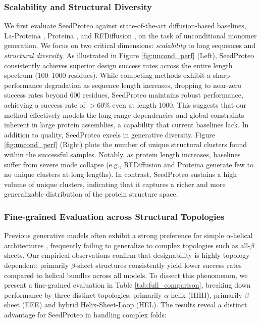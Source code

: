 \subsubsection{Scalability and Structural Diversity}
We first evaluate SeedProteo against state-of-the-art diffusion-based baselines, La-Proteina \cite{geffnerLaProteinaAtomisticProtein2025}, Proteina \cite{geffnerProteinaScalingFlowbased2024}, and RFDiffusion \cite{watsonNovoDesignProtein2023}, on the task of unconditional monomer generation. We focus on two critical dimensions: \textit{scalability} to long sequences and \textit{structural diversity}. As illustrated in Figure \ref{fig:uncond_perf} (Left), SeedProteo consistently achieves superior design success rates across the entire length spectrum (100--1000 residues). While competing methods exhibit a sharp performance degradation as sequence length increases, dropping to near-zero success rates beyond 600 residues, SeedProteo maintains robust performance, achieving a success rate of $>60\%$ even at length 1000. This suggests that our method effectively models the long-range dependencies and global constraints inherent in large protein assemblies, a capability that current baselines lack. In addition to quality, SeedProteo excels in generative diversity. Figure \ref{fig:uncond_perf} (Right) plots the number of unique structural clusters found within the successful samples. Notably, as protein length increases, baselines suffer from severe mode collapse (e.g., RFDiffusion and Proteina generate few to no unique clusters at long lengths). In contrast, SeedProteo sustains a high volume of unique clusters, indicating that it captures a richer and more generalizable distribution of the protein structure space.





\subsubsection{Fine-grained Evaluation across Structural Topologies}
Previous generative models often exhibit a strong preference for simple $\alpha$-helical architectures \cite{watsonNovoDesignProtein2023, quPallatomUnlockingNew2025}, frequently failing to generalize to complex topologies such as all-$\beta$ sheets. Our empirical observations confirm that designability is highly topology-dependent: primarily $\beta$-sheet structures consistently yield lower success rates compared to helical bundles across all models. To dissect this phenomenon, we present a fine-grained evaluation in Table \ref{tab:full_comparison}, breaking down performance by three distinct topologies: primarily $\alpha$-helix (HHH), primarily $\beta$-sheet (EEE) and hybrid Helix-Sheet-Loop (HEL). The results reveal a distinct advantage for SeedProteo in handling complex folds:

